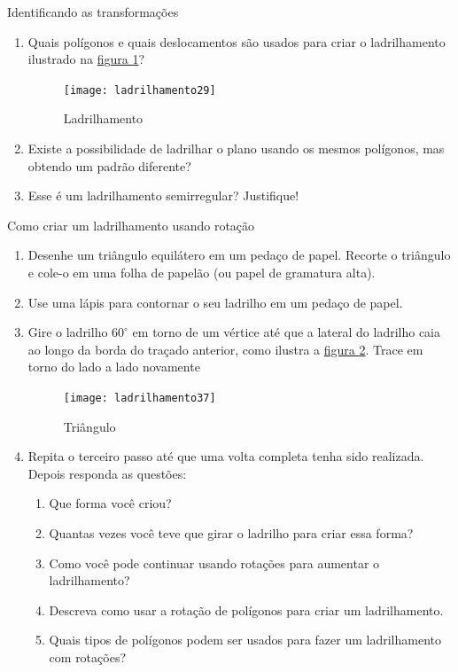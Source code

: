 \begin{task}{Identificando as transformações}

\begin{enumerate}
	\item Quais polígonos e quais deslocamentos são usados para criar o ladrilhamento ilustrado na \hyperref[transf3]{figura \ref{transf3}}?
	
	\begin{figure}[H]
	\centering
	\texttt{[image: ladrilhamento29]}
	\caption{Ladrilhamento}
	\label{transf3}
	\end{figure}
	
	\item Existe a possibilidade de ladrilhar o plano usando os mesmos polígonos,  mas obtendo um padrão diferente?
	\item Esse é um ladrilhamento semirregular? Justifique!
\end{enumerate}
\end{task}


\begin{task}{Como criar um ladrilhamento usando rotação}

\begin{enumerate}
	\item Desenhe um triângulo equilátero em um pedaço de papel. Recorte o triângulo e cole-o em uma folha de papelão (ou papel de gramatura alta).
	\item Use uma lápis para contornar o seu ladrilho em um pedaço de papel.
	\item Gire o ladrilho $60^{\circ}$ em torno de um vértice até que a lateral do ladrilho caia ao longo da borda do traçado anterior, como ilustra a \hyperref[transf4]{figura \ref{transf4}}. Trace em torno do lado a lado novamente

	\begin{figure}[H]
	\centering
	\texttt{[image: ladrilhamento37]}
	\caption{Triângulo}
	\label{transf4}
	\end{figure}

	\item Repita o terceiro passo até que uma volta completa tenha sido realizada. Depois responda as questões:
	\begin{enumerate}
		\item Que forma você criou?
		\item Quantas vezes você teve que girar o ladrilho para criar essa forma?
		\item Como você pode continuar usando rotações para aumentar o ladrilhamento?
		\item Descreva como usar a rotação de polígonos para criar um ladrilhamento.
	\item Quais tipos de polígonos podem ser usados para fazer um ladrilhamento com rotações?
		
	\end{enumerate}

	
\end{enumerate}

\end{task}

